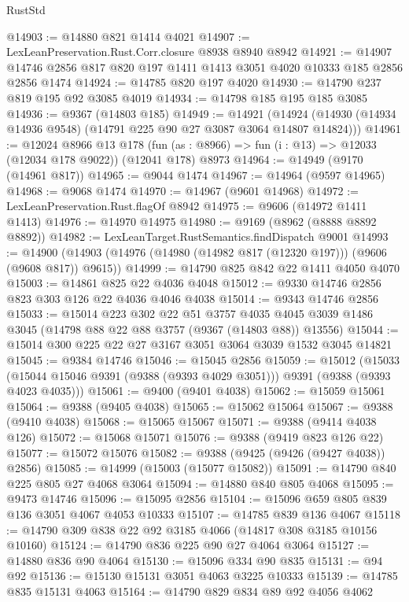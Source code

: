 \begin{lexlean}{RustStd}
\begin{coremodule}
@14903 := @14880 @821 @1414 @4021
@14907 := LexLeanPreservation.Rust.Corr.closure @8938 @8940 @8942
@14921 := @14907 @14746 @2856 @817 @820 @197 @1411 @1413 @3051 @4020 @10333 @185 @2856 @2856 @1474
@14924 := @14785 @820 @197 @4020
@14930 := @14790 @237 @819 @195 @92 @3085 @4019
@14934 := @14798 @185 @195 @185 @3085
@14936 := @9367 (@14803 @185)
@14949 := @14921
    (@14924 (@14930 (@14934 @14936 @9548) (@14791 @225 @90 @27 @3087 @3064 @14807 @14824)))
@14961 := @12024
    @8966
    @13
    @178
    (fun (as : @8966) => fun (i : @13) => @12033 (@12034 @178 @9022))
    (@12041 @178)
    @8973
@14964 := @14949 (@9170 (@14961 @817))
@14965 := @9044 @1474
@14967 := @14964 (@9597 @14965)
@14968 := @9068 @1474
@14970 := @14967 (@9601 @14968)
@14972 := LexLeanPreservation.Rust.flagOf @8942
@14975 := @9606 (@14972 @1411 @1413)
@14976 := @14970 @14975
@14980 := @9169 (@8962 (@8888 @8892 @8892))
@14982 := LexLeanTarget.RustSemantics.findDispatch @9001
@14993 := @14900 (@14903 (@14976 (@14980 (@14982 @817 (@12320 @197))) (@9606 (@9608 @817)) @9615))
@14999 := @14790 @825 @842 @22 @1411 @4050 @4070
@15003 := @14861 @825 @22 @4036 @4048
@15012 := @9330 @14746 @2856 @823 @303 @126 @22 @4036 @4046 @4038
@15014 := @9343 @14746 @2856
@15033 := @15014
    @223
    @302
    @22
    @51
    @3757
    @4035
    @4045
    @3039
    @1486
    @3045
    (@14798 @88 @22 @88 @3757 (@9367 (@14803 @88)) @13556)
@15044 := @15014 @300 @225 @22 @27 @3167 @3051 @3064 @3039 @1532 @3045 @14821
@15045 := @9384 @14746
@15046 := @15045 @2856
@15059 := @15012
    (@15033 (@15044 @15046 @9391 (@9388 (@9393 @4029 @3051))) @9391 (@9388 (@9393 @4023 @4035)))
@15061 := @9400 (@9401 @4038)
@15062 := @15059 @15061
@15064 := @9388 (@9405 @4038)
@15065 := @15062 @15064
@15067 := @9388 (@9410 @4038)
@15068 := @15065 @15067
@15071 := @9388 (@9414 @4038 @126)
@15072 := @15068 @15071
@15076 := @9388 (@9419 @823 @126 @22)
@15077 := @15072 @15076
@15082 := @9388 (@9425 (@9426 (@9427 @4038)) @2856)
@15085 := @14999 (@15003 (@15077 @15082))
@15091 := @14790 @840 @225 @805 @27 @4068 @3064
@15094 := @14880 @840 @805 @4068
@15095 := @9473 @14746
@15096 := @15095 @2856
@15104 := @15096 @659 @805 @839 @136 @3051 @4067 @4053 @10333
@15107 := @14785 @839 @136 @4067
@15118 := @14790 @309 @838 @22 @92 @3185 @4066 (@14817 @308 @3185 @10156 @10160)
@15124 := @14790 @836 @225 @90 @27 @4064 @3064
@15127 := @14880 @836 @90 @4064
@15130 := @15096 @334 @90 @835
@15131 := @94 @92
@15136 := @15130 @15131 @3051 @4063 @3225 @10333
@15139 := @14785 @835 @15131 @4063
@15164 := @14790
    @829
    @834
    @89
    @92
    @4056
    @4062

\end{coremodule}
\end{lexlean}
